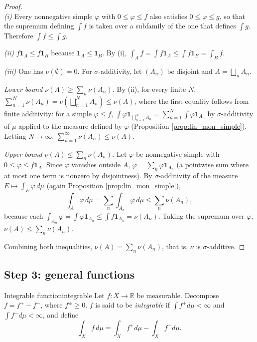 \documentclass[11pt, a4paper]{article}
\begin{document}
\begin{proof}\leavevmode\\
\textit{(i)} Every nonnegative simple $\varphi$ with $0 \le \varphi \le f$ also satisfies
$0 \le \varphi \le g$, so that the supremum defining $\int f$ is taken over a subfamily of the one that
defines $\int g$. Therefore $\int f \le \int g$.

\textit{(ii)} $f \mathbf{1}_A \le f \mathbf{1}_B$ because $\mathbf{1}_A \le \mathbf{1}_B$. By (i),
$\int_A f = \int f \mathbf{1}_A \le \int f \mathbf{1}_B = \int_B f$.

\textit{(iii)} One has $\nu(\emptyset) = 0$. For $\sigma$-additivity, let $(A_n)$ be disjoint and
$A = \bigsqcup_n A_n$.

\emph{Lower bound $\nu(A) \ge \sum_n \nu(A_n)$.} By (ii), for every finite $N$,
$\sum_{n=1}^N \nu(A_n) = \nu\!\left(\bigsqcup_{n=1}^N A_n\right) \le \nu(A)$, where the first
equality follows from finite additivity: for a simple $\varphi \le f$, $\int \varphi
\mathbf{1}_{\bigsqcup_{n=1}^N A_n} = \sum_{n=1}^N \int \varphi \mathbf{1}_{A_n}$ by
$\sigma$-additivity of $\mu$ applied to the measure defined by $\varphi$ (Proposition
\ref{prop:lin_mon_simple}). Letting $N \to \infty$, $\sum_{n=1}^\infty \nu(A_n) \le \nu(A)$.

\emph{Upper bound $\nu(A) \le \sum_n \nu(A_n)$.} Let $\varphi$ be nonnegative simple with
$0 \le \varphi \le f \mathbf{1}_A$. Since $\varphi$ vanishes outside $A$, $\varphi = \sum_n \varphi
\mathbf{1}_{A_n}$ (a pointwise sum where at most one term is nonzero by disjointness). By
$\sigma$-additivity of the measure $E \mapsto \int_E \varphi \, d\mu$ (again Proposition
\ref{prop:lin_mon_simple}),
$$ \int_A \varphi \, d\mu = \sum_n \int_{A_n} \varphi \, d\mu \le \sum_n \nu(A_n), $$
because each $\int_{A_n} \varphi = \int \varphi \mathbf{1}_{A_n} \le \int f \mathbf{1}_{A_n} =
\nu(A_n)$. Taking the supremum over $\varphi$, $\nu(A) \le \sum_n \nu(A_n)$.

Combining both inequalities, $\nu(A) = \sum_n \nu(A_n)$, that is, $\nu$ is $\sigma$-additive.
\end{proof}

\subsection{Step 3: general functions}

\begin{definicion}{Integrable function}{integrable}
Let $f: X \to \mathbb{R}$ be measurable. Decompose $f = f^+ - f^-$, where $f^\pm \ge 0$.
$f$ is said to be \emph{integrable} if $\int f^+ d\mu < \infty$ and $\int f^- d\mu < \infty$, and define
$$ \int_X f \, d\mu = \int_X f^+ d\mu - \int_X f^- d\mu. $$
\end{definicion}
\end{document}
